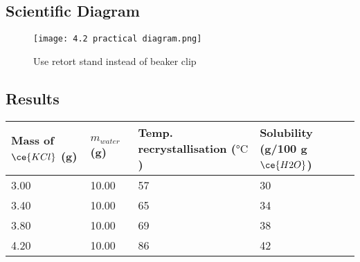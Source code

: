 	\subsection{Scientific Diagram}

		\begin{figure}[H]
			\centering
			\texttt{[image: 4.2 practical diagram.png]}
			\caption{Use retort stand instead of beaker clip}
		\end{figure}
	
	\newpage
	
	\subsection{Results}
		\begin{table}[H]
		\centering
			\begin{tabular}{llll}
			\hline
			Mass of $\ce{KCl}$ (g) 		& $m_{water}$ (g)		& Temp. recrystallisation ($\unit{\degreeCelsius}$)	& Solubility (g/100 g $\ce{H2O}$)	\\ \hline
			3.00						& 10.00					& 57 												& 30								\\
			3.40						& 10.00					& 65 												& 34								\\
			3.80						& 10.00					& 69 												& 38								\\
			4.20						& 10.00					& 86 												& 42 								\\ \hline
			\end{tabular}
		\end{table}

